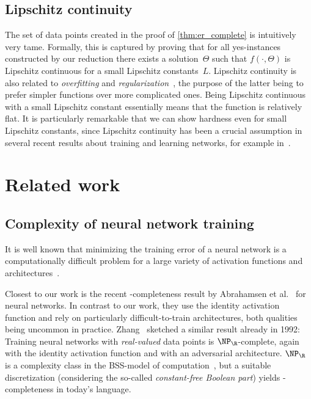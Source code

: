 \documentclass{toc}
\begin{document}

\subsection{Lipschitz continuity}
The set of data points created in the proof of \cref{thm:er_complete} is intuitively very tame.
Formally, this is captured by proving that for all yes-instances constructed by our reduction there exists a solution~$\Theta$ such that $f(\cdot, \Theta)$ is Lipschitz continuous for a small Lipschitz %
constants~$L$.  %
Lipschitz continuity is also related to \emph{overfitting} and \emph{regularization}~\cite{Gouk2021_Regularisation}, the purpose of the latter being to prefer simpler functions over more complicated ones.
Being Lipschitz continuous with a small Lipschitz constant
essentially means that the function is relatively flat.
It is particularly remarkable that we can show hardness even for small Lipschitz constants, since Lipschitz continuity has been a crucial assumption in several recent results about training and learning \ReLU networks, for example in~\cite{Bienstock2023_LinearProgramming, Chen2022_LearningFTP, Goel2017_ReliablyLearning, bubeck2023universal}.
%


\section{Related work}
\label{sec:related_work}

\subsection{Complexity of neural network training}
It is %
well known  %
that minimizing the training error of a neural network is a computationally difficult problem for a large variety of activation functions and architectures~\cite{Shalev2014_UnderstandingML}.

Closest to our work is the recent \ER-completeness result by Abrahamsen et al.~\cite{Abrahamsen2021_NeuralNetworks} for \twolayer neural networks.
In contrast to our work, they use the identity activation function and rely on particularly
%
difficult-to-train  %
architectures, both qualities being uncommon in practice.
Zhang~\cite{Zhang1992_BSS} sketched a similar result already in 1992:
Training neural networks with \emph{real-valued} data points is $\NP_\R$-complete, again with the identity activation function and with an adversarial architecture.
$\NP_\R$ is a complexity class in the BSS-model of computation~\cite{Blum1989_ComputationOverTheReals}, but a suitable discretization (considering the so-called \emph{constant-free Boolean part}) yields \ER-completeness in today's language.
\end{document}
